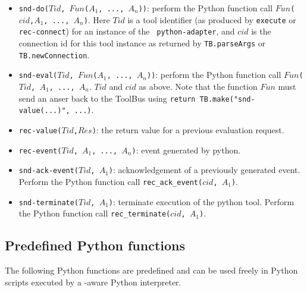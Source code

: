 \begin{itemize}
\item {\tt snd-do($Tid$, $Fun$($A_1$, ..., $A_n$))}: perform the Python
function call
{\tt $Fun$($cid$,$A_1$, ..., $A_n$)}. Here $Tid$ is a tool identifier
(as produced by {\tt execute} or {\tt rec-connect}) for an instance of the {\tt
python-adapter}, and $cid$ is the connection id for this tool instance 
as returned by {\tt TB.parseArgs} or {\tt TB.newConnection}.
\item {\tt snd-eval($Tid$, $Fun$($A_1$, ..., $A_n$))}: perform the Python
function call
{\tt $Fun$($Tid$, $A_1$, ..., $A_n$}. $Tid$ and $cid$ as above.
Note that the function {\tt $Fun$} must send an anser back to the
ToolBus using {\tt return TB.make("snd-value(...)", ...)}.
\item {\tt rec-value($Tid$,$Res$)}: the return value for a previous evaluation request.
\item {\tt rec-event($Tid$, $A_1$, ..., $A_n$)}: event generated by python.
\item {\tt snd-ack-event($Tid$, $A_1$)}: acknowledgement of
a previously generated event. Perform the Python function call
{\tt rec\_ack\_event($cid$, $A_1$)}.
\item {\tt snd-terminate($Tid$, $A_1$)}: terminate execution of the
python tool. Perform the Python function call
{\tt rec\_terminate($cid$, $A_1$)}.
\end{itemize}


\subsection{\label{Python-functions}Predefined Python functions}
The following Python functions are predefined and can be used freely in Python
scripts executed by a \TB -aware Python interpreter.

